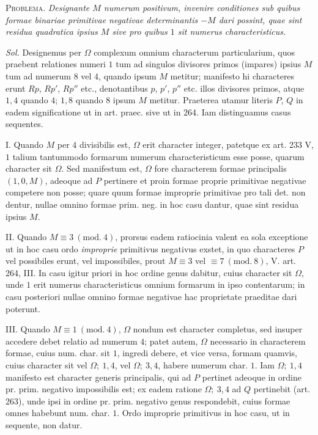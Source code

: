 \textsc{Problema.} \textit{Designante $M$ numerum positivum, invenire conditiones sub quibus formae binariae primitivae negativae determinantis $-M$ dari possint, quae sint residua quadratica ipsius $M$ sive pro quibus $1$ sit numerus characteristicus.}

\textit{Sol.} Designemus per $\Omega$ complexum omnium characterum particularium, quos praebent relationes numeri $1$ tum ad singulos divisores primos (impares) ipsius $M$ tum ad numerum $8$ vel $4$, quando ipsum $M$ metitur; manifesto hi characteres erunt $Rp$, $Rp'$, $Rp''$ etc., denotantibus $p$, $p'$, $p''$ etc. illos divisores primos, atque $1,4$ quando $4$; $1,8$ quando $8$ ipsum $M$ metitur. Praeterea utamur literis $P$, $Q$ in eadem significatione ut in art. praec. sive ut in 264. Iam distinguamus casus sequentes.

I. Quando $M$ per $4$ divisibilis est, $\Omega$ erit character integer, patetque ex art. 233 V, $1$ talium tantummodo formarum numerum characteristicum esse posse, quarum character sit $\Omega$. Sed manifestum est, $\Omega$ fore characterem formae principalis $(1,0,M)$, adeoque ad $P$ pertinere et proin formae proprie primitivae negativae competere non posse; quare quum formae improprie primitivae pro tali det. non dentur, nullae omnino formae prim. neg. in hoc casu dantur, quae sint residua ipsius $M$.

II. Quando $M\equiv3\ (\mathrm{mod.}\ 4)$, prorsus eadem ratiocinia valent ea sola exceptione ut in hoc casu ordo \textit{improprie} primitivus negativus exstet, in quo characteres $P$ vel possibiles erunt, vel impossibiles, prout $M\equiv3$ vel $\equiv7\ (\mathrm{mod.}\ 8)$, V. art. 264, III. In casu igitur priori in hoc ordine genus dabitur, cuius character sit $\Omega$, unde $1$ erit numerus characteristicus omnium formarum in ipso contentarum; in casu posteriori nullae omnino formae negativae hac proprietate praeditae dari poterunt.

III. Quando $M\equiv1\ (\mathrm{mod.}\ 4)$, $\Omega$ nondum est character completus, sed insuper accedere debet relatio ad numerum $4$; patet autem, $\Omega$ necessario in characterem formae, cuius num. char. sit $1$, ingredi debere, et vice versa, formam quamvis, cuius character sit vel $\Omega;\ 1,4$, vel $\Omega;\ 3,4$, habere numerum char. $1$. Iam $\Omega;\ 1,4$ manifesto est character generis principalis, qui ad $P$ pertinet adeoque in ordine pr. prim. negativo impossibilis est; ex eadem ratione $\Omega;\ 3,4$ ad $Q$ pertinebit (art. 263), unde ipsi in ordine pr. prim. negativo genus respondebit, cuius formae omnes habebunt num. char. $1$. Ordo improprie primitivus in hoc casu, ut in sequente, non datur.

